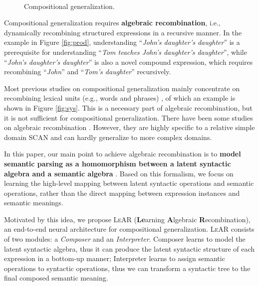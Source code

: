 \documentclass[11pt,a4paper]{article}
\begin{document}
\begin{figure}
  \centering
  \\
  \caption{Compositional generalization.
  }
\end{figure}

Compositional generalization requires \textbf{algebraic recombination}, i.e., dynamically recombining structured expressions in a recursive manner.
In the example in Figure \ref{fig:prod}, understanding ``\emph{John's daughter's daughter}'' is a prerequisite for understanding ``\emph{Tom teaches John's daughter's daughter}'', while ``\emph{John's daughter's daughter}'' is also a novel compound expression, which requires recombining ``\emph{John}'' and ``\emph{Tom's daughter}'' recursively.


Most previous studies on compositional generalization mainly concentrate on recombining lexical units (e.g., words and phrases) \cite{nips2019dataaug,li2019compositional,andreas2019dataaug,Gordon2020spstru,aky2020dataaug,guo2020dataaugl,russin2019spstru}, of which an example is shown in Figure \ref{fig:sys}.
This is a necessary part of algebraic recombination, but it is not sufficient for compositional generalization.
There have been some studies on algebraic recombination \cite{liu2020spstru, chen2020spstru}.
However, they are highly specific to a relative simple domain SCAN \cite{lake2018scan} and can hardly generalize to more complex domains.

In this paper, our main point to achieve algebraic recombination is to \textbf{model semantic parsing as a homomorphism between a latent syntactic algebra and a semantic algebra} \cite{montague1970universal-algre, marcus2019algebraic}.
Based on this formalism, we focus on learning the high-level mapping between latent syntactic operations and semantic operations, rather than the direct mapping between expression instances and semantic meanings.







Motivated by this idea, we propose \textsc{LeAR} (\textbf{Le}arning \textbf{A}lgebraic \textbf{R}ecombination), an end-to-end neural architecture for compositional generalization.
\textsc{LeAR} consists of two modules: a \textit{Composer} and an \textit{Interpreter}.
Composer learns to model the latent syntactic algebra, thus it can produce the latent syntactic structure of each expression in a bottom-up manner;
Interpreter learns to assign semantic operations to syntactic operations, thus we can transform a syntactic tree to the final composed semantic meaning.
\end{document}
